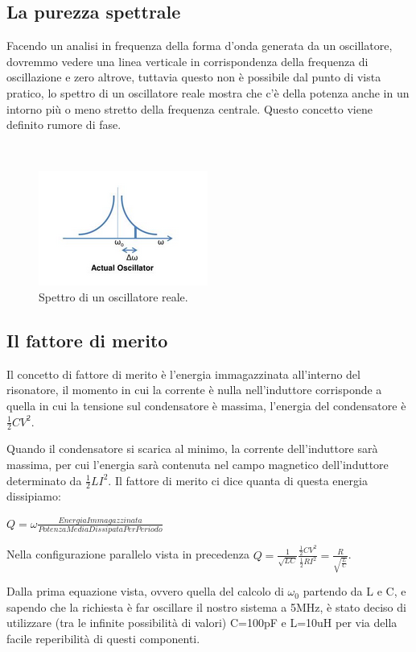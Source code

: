 \documentclass{article}
\begin{document}
\subsection{La purezza spettrale}
Facendo un analisi in frequenza della forma d'onda generata da un oscillatore, dovremmo vedere una linea verticale in corrispondenza della frequenza di oscillazione e zero altrove, tuttavia questo non è possibile dal punto di vista pratico, lo spettro di un oscillatore reale mostra che c'è della potenza anche in un intorno più o meno stretto della frequenza centrale.
Questo concetto viene definito rumore di fase.

~\begin{figure}[H]
\includegraphics[scale=1]{PhaseNoise.png} 
\caption{Spettro di un oscillatore reale.}
\label{fig:foo}
\end{figure}

\subsection{Il fattore di merito}
Il concetto di fattore di merito è l'energia immagazzinata all'interno del risonatore, il momento in cui la corrente è nulla nell'induttore corrisponde a quella in cui la tensione sul condensatore è massima, l'energia del condensatore è $\frac{1}{2}CV^2$.

Quando il condensatore si scarica al minimo, la corrente dell'induttore sarà massima, per cui l'energia sarà contenuta nel campo magnetico dell'induttore determinato da $\frac{1}{2}LI^2$.
Il fattore di merito ci dice quanta di questa energia dissipiamo:

$Q=\omega\frac{EnergiaImmagazzinata}{PotenzaMediaDissipataPerPeriodo}$
\centering

Nella configurazione parallelo vista in precedenza $Q=\frac{1}{\sqrt{LC}}\frac{\frac{1}{2}CV^2}{\frac{1}{2}RI^2}=\frac{R}{\sqrt{\frac{L}{C}}}$.

Dalla prima equazione vista, ovvero quella del calcolo di $\omega_0$ partendo da L e C, e sapendo che la richiesta è far oscillare il nostro sistema a 5MHz, è stato deciso di utilizzare (tra le infinite possibilità di valori) C=100pF e L=10uH per via della facile reperibilità di questi componenti.
\end{document}
